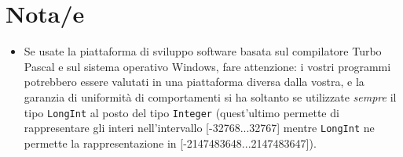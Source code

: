 \documentclass[a4paper,11pt]{article}
\begin{document}
\section*{Nota/e}
\begin{itemize}
  
    \item 
Se usate la piattaforma di sviluppo software basata sul compilatore
Turbo Pascal e sul sistema operativo Windows, fare attenzione: i
vostri programmi potrebbero essere valutati in una piattaforma diversa
dalla vostra, e la garanzia di uniformità di comportamenti si
ha soltanto se utilizzate \emph{sempre} il tipo \texttt{LongInt}
al posto del tipo \texttt{Integer} (quest'ultimo permette di
rappresentare gli interi nell'intervallo [-32768...32767] mentre
\texttt{LongInt} ne permette la rappresentazione in
[-2147483648...2147483647]).

\end{itemize}
\end{document}
